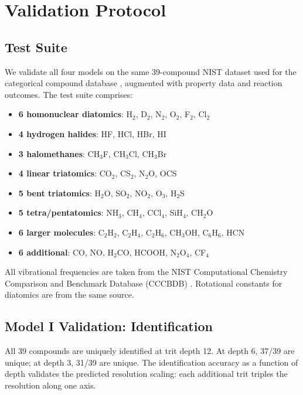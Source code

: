 \documentclass[11pt,twocolumn,a4paper]{article}
\theoremstyle{definition}
\theoremstyle{remark}
\begin{document}
\section{Validation Protocol}
\label{sec:validation}

\subsection{Test Suite}

We validate all four models on the same 39-compound NIST dataset used for the categorical compound database \citep{sachikonye2025c}, augmented with property data and reaction outcomes. The test suite comprises:

\begin{itemize}[nosep]
\item \textbf{6 homonuclear diatomics}: H$_2$, D$_2$, N$_2$, O$_2$, F$_2$, Cl$_2$
\item \textbf{4 hydrogen halides}: HF, HCl, HBr, HI
\item \textbf{3 halomethanes}: CH$_3$F, CH$_3$Cl, CH$_3$Br
\item \textbf{4 linear triatomics}: CO$_2$, CS$_2$, N$_2$O, OCS
\item \textbf{5 bent triatomics}: H$_2$O, SO$_2$, NO$_2$, O$_3$, H$_2$S
\item \textbf{5 tetra/pentatomics}: NH$_3$, CH$_4$, CCl$_4$, SiH$_4$, CH$_2$O
\item \textbf{6 larger molecules}: C$_2$H$_2$, C$_2$H$_4$, C$_2$H$_6$, CH$_3$OH, C$_6$H$_6$, HCN
\item \textbf{6 additional}: CO, NO, H$_2$CO, HCOOH, N$_2$O$_4$, CF$_4$
\end{itemize}

All vibrational frequencies are taken from the NIST Computational Chemistry Comparison and Benchmark Database (CCCBDB) \citep{johnson2022}. Rotational constants for diatomics are from the same source.

\subsection{Model I Validation: Identification}

All 39 compounds are uniquely identified at trit depth 12. At depth 6, 37/39 are unique; at depth 3, 31/39 are unique. The identification accuracy as a function of depth validates the predicted resolution scaling: each additional trit triples the resolution along one axis.
\end{document}
